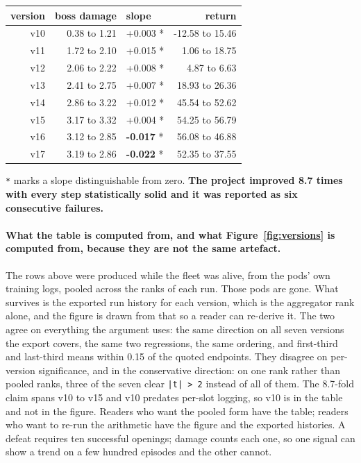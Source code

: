 \documentclass[11pt]{article}
\begin{document}
\begin{table}[!htbp]
  \centering
  \label{tab:bossdamageandreturnacrosseig}
\begin{center}\small
\begin{tabularx}{\linewidth}{@{}rrXr@{}}
\toprule
\textbf{version} & \textbf{boss damage} & \textbf{slope} & \textbf{return} \\
\midrule
v10 & 0.38 to 1.21 & +0.003 * & -12.58 to 15.46 \\
v11 & 1.72 to 2.10 & +0.015 * & 1.06 to 18.75 \\
v12 & 2.06 to 2.22 & +0.008 * & 4.87 to 6.63 \\
v13 & 2.41 to 2.75 & +0.007 * & 18.93 to 26.36 \\
v14 & 2.86 to 3.22 & +0.012 * & 45.54 to 52.62 \\
v15 & 3.17 to 3.32 & +0.004 * & 54.25 to 56.79 \\
v16 & 3.12 to 2.85 & \textbf{-0.017} * & 56.08 to 46.88 \\
v17 & 3.19 to 2.86 & \textbf{-0.022} * & 52.35 to 37.55 \\
\bottomrule
\end{tabularx}
\end{center}
\end{table}

\texttt{*} marks a slope distinguishable from zero. \textbf{The project improved 8.7 times with every step statistically solid and it was reported as six consecutive failures.}

\paragraph{What the table is computed from, and what Figure~\ref{fig:versions} is computed from, because they are not the same artefact.} The rows above were produced while the fleet was alive, from the pods' own training logs, pooled across the ranks of each run. Those pods are gone. What survives is the exported run history for each version, which is the aggregator rank alone, and the figure is drawn from that so a reader can re-derive it. The two agree on everything the argument uses: the same direction on all seven versions the export covers, the same two regressions, the same ordering, and first-third and last-third means within 0.15 of the quoted endpoints. They disagree on per-version significance, and in the conservative direction: on one rank rather than pooled ranks, three of the seven clear \texttt{|t| > 2} instead of all of them. The 8.7-fold claim spans v10 to v15 and v10 predates per-slot logging, so v10 is in the table and not in the figure. Readers who want the pooled form have the table; readers who want to re-run the arithmetic have the figure and the exported histories. A defeat requires ten successful openings; damage counts each one, so one signal can show a trend on a few hundred episodes and the other cannot.
\end{document}

